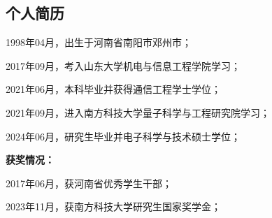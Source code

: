 
\begin{resume}

  \section*{个人简历} %

  1998年04月，出生于河南省南阳市邓州市；

  2017年09月，考入山东大学机电与信息工程学院学习；
  
  2021年06月，本科毕业并获得通信工程学士学位；

  2021年09月，进入南方科技大学量子科学与工程研究院学习；
  
  2024年06月，研究生毕业并电子科学与技术硕士学位；

  \textbf{获奖情况：}



  2017年06月，获河南省优秀学生干部；

  2023年11月，获南方科技大学研究生国家奖学金；
  







\end{resume}
